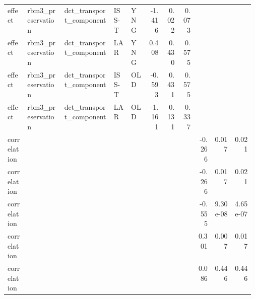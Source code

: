 \documentclass[11pt]{article}
\begin{document}
\begin{landscape}
\begin{longtable}{p{0.08\linewidth}p{0.15\linewidth}p{0.20\linewidth}p{0.07\linewidth}p{0.07\linewidth}rrrrrr}
effect & rbm3\_preservation & dct\_transport\_component & ISS-T & YNG & -1.416 & 0.022 & 0.073 &  &  &  \\
effect & rbm3\_preservation & dct\_transport\_component & LAR & YNG & 0.408 & 0.430 & 0.575 &  &  &  \\
effect & rbm3\_preservation & dct\_transport\_component & ISS-T & OLD & -0.593 & 0.431 & 0.575 &  &  &  \\
effect & rbm3\_preservation & dct\_transport\_component & LAR & OLD & -1.161 & 0.131 & 0.337 &  &  &  \\
correlation &  &  &  &  &  &  &  & -0.266 & 0.017 & 0.021 \\
correlation &  &  &  &  &  &  &  & -0.266 & 0.017 & 0.021 \\
correlation &  &  &  &  &  &  &  & -0.555 & 9.30e-08 & 4.65e-07 \\
correlation &  &  &  &  &  &  &  & 0.301 & 0.007 & 0.017 \\
correlation &  &  &  &  &  &  &  & 0.086 & 0.446 & 0.446 \\
\bottomrule
\end{longtable}
\normalsize
\end{landscape}
\end{document}
